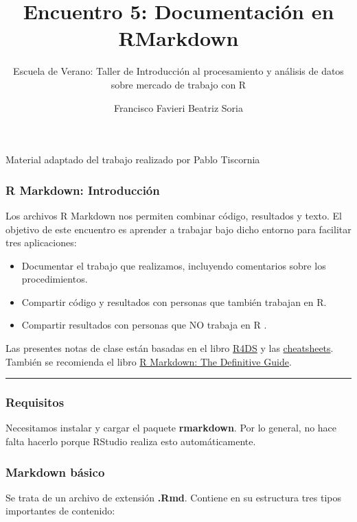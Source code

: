 \documentclass[
]{article}
\title{Encuentro 5: Documentación en RMarkdown}
\subtitle{Escuela de Verano: Taller de Introducción al procesamiento y
análisis de datos sobre mercado de trabajo con R}
\author{Francisco Favieri \textbar{} Beatriz Soria}
\date{}
\providecommand{\tightlist}{%
  \setlength{\itemsep}{0pt}\setlength{\parskip}{0pt}}
\begin{document}
\maketitle

{
\setcounter{tocdepth}{2}
\tableofcontents
}
Material adaptado del trabajo realizado por Pablo Tiscornia

\subsubsection{R Markdown:
Introducción}\label{r-markdown-introducciuxf3n}

Los archivos R Markdown nos permiten combinar código, resultados y
texto. El objetivo de este encuentro es aprender a trabajar bajo dicho
entorno para facilitar tres aplicaciones:

\begin{itemize}
\tightlist
\item
  Documentar el trabajo que realizamos, incluyendo comentarios sobre los
  procedimientos.
\item
  Compartir código y resultados con personas que también trabajan en R.
\item
  Compartir resultados con personas que NO trabaja en R .
\end{itemize}

Las presentes notas de clase están basadas en el libro
\href{https://es.r4ds.hadley.nz/r-markdown.html}{R4DS} y las
\href{https://www.rstudio.com/resources/cheatsheets/}{cheatsheets}.
También se recomienda el libro
\href{https://bookdown.org/yihui/rmarkdown/}{R Markdown: The Definitive
Guide}.

\begin{center}\rule{0.5\linewidth}{0.5pt}\end{center}

\subsubsection{Requisitos}\label{requisitos}

Necesitamos instalar y cargar el paquete \textbf{rmarkdown}. Por lo
general, no hace falta hacerlo porque RStudio realiza esto
automáticamente.

\subsubsection{Markdown básico}\label{markdown-buxe1sico}

Se trata de un archivo de extensión \textbf{.Rmd}. Contiene en su
estructura tres tipos importantes de contenido:
\end{document}
